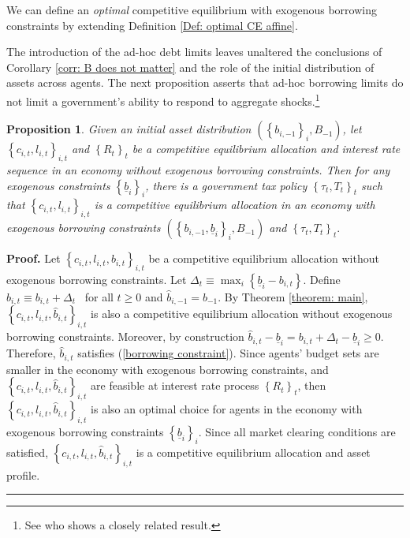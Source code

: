 \documentclass[11.5pt,twoside]{article}
\newtheorem{proposition}{\color{ChadGreen} Proposition}
\newenvironment{proof}[1][Proof]{\noindent \textbf{#1.} }{\  \rule{0.5em}{0.5em}}
\begin{document}
We can define an \emph{optimal} competitive equilibrium with exogenous borrowing
constraints by extending Definition \ref{Def: optimal CE affine}.

The introduction of the ad-hoc debt limits leaves unaltered the conclusions of  Corollary  \ref{corr: B does not matter} and
the role of the initial distribution of assets across agents.
 The next proposition asserts
that ad-hoc borrowing limits do not limit a government's ability to respond to
aggregate shocks.\footnote{%
See \citet{Yared2012,Yared2013}  who shows a closely related result.}
\smallskip

\begin{proposition}
\label{thm:borrowing_constraint}  Given an initial asset distribution $\left(
\left\{ b_{i,-1}\right\} _{i},B_{-1}\right)$, let $\left\{ c_{i,t},l_{i,t}\right\} _{i,t}$ and $\left\{ R_{t}\right\}_t $ be a competitive
equilibrium allocation and interest rate sequence in an economy without
exogenous borrowing constraints. Then for any exogenous
constraints $\left\{ \underline{b}_{i}\right\} _{i}$, there is a government
tax policy $\left\{ \tau _{t},T_{t}\right\} _{t}$ such that $\left\{
c_{i,t},l_{i,t}\right\} _{i,t}$ is a competitive equilibrium
allocation in an economy with exogenous borrowing constraints $\left(
\left\{ b_{i,-1},\underline{b}_{i}\right\} _{i},B_{-1}\right) $ and $\left\{
\tau _{t},T_{t}\right\} _{t}.$
\end{proposition}

\begin{proof}
Let $\left\{ c_{i,t},l_{i,t},b_{i,t}\right\} _{i,t}$
be a competitive equilibrium allocation without exogenous borrowing
constraints. Let $\Delta _{t}\equiv \max_{i}\left\{ \underline{b}%
_{i}-b_{i,t}\right\} .$ Define $\hat{b}_{i,t}\equiv b_{i,t}+\Delta _{t}$ \ for all $t\geq 0$ and $\hat{b}_{i,-1}=b_{-1}.$ By Theorem %
\ref{theorem: main}, $\left\{ c_{i,t},l_{i,t},\hat{b}%
_{i,t}\right\} _{i,t}$ is also a competitive equilibrium allocation without
exogenous borrowing constraints. Moreover, by construction $\hat{b}_{i,t}-%
\underline{b}_{i}=b_{i,t}+\Delta _{t}-\underline{b}_{i}\geq 0$.
Therefore, $\hat{b}_{i,t}$ satisfies (\ref{borrowing constraint}). Since
agents' budget sets are smaller in the economy with exogenous borrowing
constraints, and $\left\{ c_{i,t},l_{i,t},\hat{b}%
_{i,t}\right\} _{i,t}$ are feasible at interest rate process $\left\{
R_{t}\right\} _{t}$, then $\left\{ c_{i,t},l_{i,t},%
\hat{b}_{i,t}\right\} _{i,t}$ is also an optimal choice for agents in the
economy with exogenous borrowing constraints $\left\{ \underline{b}%
_{i}\right\} _{i}.$ Since all market clearing conditions are satisfied, $%
\left\{ c_{i,t},l_{i,t},\hat{b}_{i,t}\right\} _{i,t}$ is a
competitive equilibrium allocation and asset profile.
\end{proof}
\end{document}
